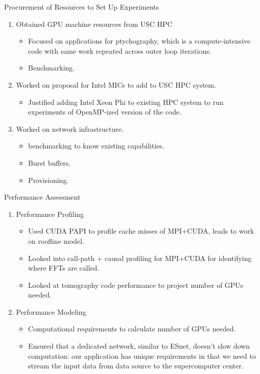 \begin{frame}{Procurement of Resources to Set Up Experiments} 
\begin{enumerate} 
\item Obtained GPU machine resources from USC HPC
\begin{itemize}
\small \item \small Focused on applications for ptychography, which is
a compute-intensive code with same work repeated across outer loop
iterations. 
\small \item \small Benchmarking. 
\end{itemize}
\item Worked on proposal for Intel MICs to add to USC HPC system.
\begin{itemize} 
  \small \item \small Justified adding Intel Xeon Phi to existing HPC
  system to run experiments of OpenMP-ized version of the code. 
\end{itemize} 
\item Worked on network infrastructure. 
\begin{itemize} 
\item \small benchmarking to know existing capabilities.
\item \small Burst buffers. 
\item \small Provisioning. 
\end{itemize}
\end{enumerate}
\end{frame} 

\begin{frame}{Performance Assessment}
\begin{enumerate}
\item Performance Profiling
\begin{itemize}
\item Used CUDA PAPI to profile cache misses of MPI+CUDA, leads to work on roofline model.
\item Looked into call-path + causal profiling for MPI+CUDA for identifying where FFTs are called. 
\item Looked at tomography code performance to project number of GPUs needed. 
\end{itemize} 
\item Performance Modeling
\begin{itemize}
\item Computational requirements to calculate number of GPUs needed. 
\item Ensured that a dedicated network, similar to ESnet, doesn’t slow down computation: our application has unique requirements in that we 
  need to stream the input data from data source to the supercomputer center. 
\end{itemize} 
\end{enumerate} 
\end{frame} 

